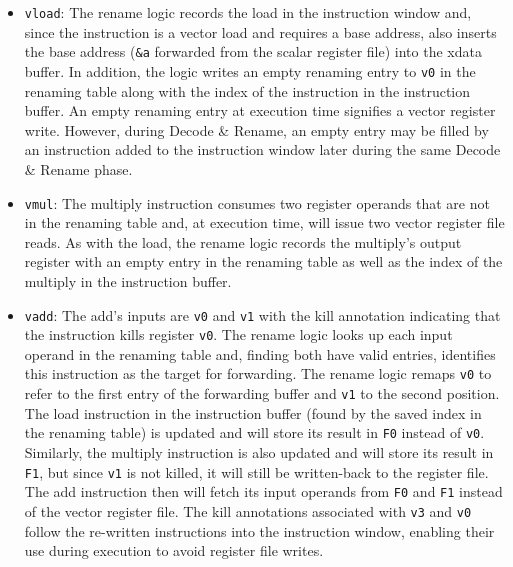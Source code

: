 \begin{itemize}
\item {\tt vload}:
The rename logic records the load in the instruction window and, since the instruction
is a vector load and requires a base address, also inserts the base address ({\tt \&a} forwarded from the scalar register file) into the xdata buffer.
% 
In addition, the logic writes an empty renaming entry to {\tt v0} in the renaming table along with the index of the instruction in the instruction buffer.
%
An empty renaming entry at execution time signifies a vector register write.
However, during Decode \& Rename, an empty entry may be filled by an instruction added to
the instruction window later during the same Decode \& Rename phase.
\item {\tt vmul}: The multiply instruction consumes two register operands that are not in the renaming table and, at execution time, will issue
two vector register file reads.
%
As with the load, the rename logic records the multiply's output register with 
an empty entry in the renaming table as well as the index of the multiply in the
instruction buffer.
\item {\tt vadd}:
The add's inputs are {\tt v0} and {\tt v1} with the kill annotation indicating
that the instruction kills register {\tt v0}.
%
The rename logic looks up each input operand in the renaming table and, finding 
both have valid entries, identifies this instruction as the target for forwarding.
%
The rename logic remaps {\tt v0} to refer to the first entry of the forwarding
buffer and {\tt v1} to the second position. 
%
The load instruction in the instruction buffer (found by the saved index in the renaming table) 
is updated and will store its result in {\tt F0} instead of {\tt v0}.
%
Similarly, the multiply instruction is also updated and will store its result in {\tt F1}, but since {\tt v1} is not killed, it will still be written-back to the register file. 
%
The add instruction then will fetch its input operands from {\tt F0}
and {\tt F1} instead of the vector register file.
%
The kill annotations associated with {\tt v3} and {\tt v0} follow the re-written
instructions into the instruction window, enabling their use during execution
to avoid register file writes.
\end{itemize}

\figMANICMANICb

